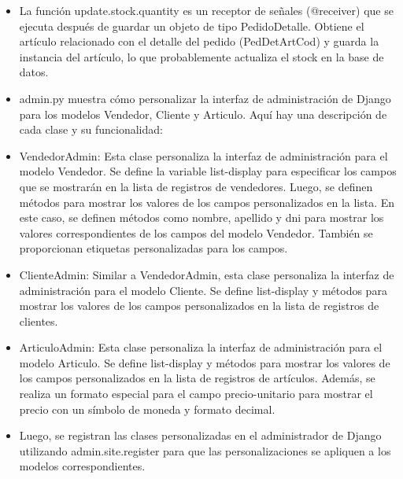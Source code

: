 \documentclass{article}
\begin{document}
\begin{itemize}
\begin{itemize}
\begin{itemize}
                \item La función update.stock.quantity es un receptor de señales (@receiver) que se ejecuta después de guardar un objeto de tipo PedidoDetalle. Obtiene el artículo relacionado con el detalle del pedido (PedDetArtCod) y guarda la instancia del artículo, lo que probablemente actualiza el stock en la base de datos.
        \end{itemize}
            
            \begin{itemize}
                    \item admin.py muestra cómo personalizar la interfaz de administración de Django para los modelos Vendedor, Cliente y Articulo. Aquí hay una descripción de cada clase y su funcionalidad:
                    \item VendedorAdmin: Esta clase personaliza la interfaz de administración para el modelo Vendedor. Se define la variable list-display para especificar los campos que se mostrarán en la lista de registros de vendedores. Luego, se definen métodos para mostrar los valores de los campos personalizados en la lista. En este caso, se definen métodos como nombre, apellido y dni para mostrar los valores correspondientes de los campos del modelo Vendedor. También se proporcionan etiquetas personalizadas para los campos.
                    \item ClienteAdmin: Similar a VendedorAdmin, esta clase personaliza la interfaz de administración para el modelo Cliente. Se define list-display y métodos para mostrar los valores de los campos personalizados en la lista de registros de clientes.
                    \item ArticuloAdmin: Esta clase personaliza la interfaz de administración para el modelo Articulo. Se define list-display y métodos para mostrar los valores de los campos personalizados en la lista de registros de artículos. Además, se realiza un formato especial para el campo precio-unitario para mostrar el precio con un símbolo de moneda y formato decimal.
                    \item Luego, se registran las clases personalizadas en el administrador de Django utilizando admin.site.register para que las personalizaciones se apliquen a los modelos correspondientes.
            \end{itemize}
            
            \begin{itemize}


\end{itemize}
\end{itemize}
\end{itemize}
\end{document}
